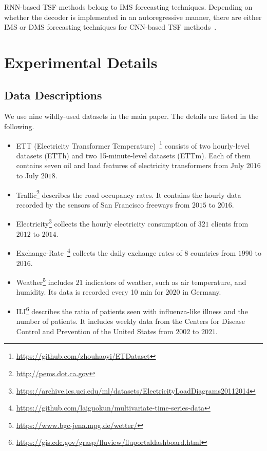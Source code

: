 RNN-based TSF methods belong to IMS forecasting techniques. Depending on whether the decoder is implemented in an autoregressive manner, there are either IMS or DMS forecasting techniques for CNN-based TSF methods~\cite{bai2018empirical,liu2021time}. 

\section{Experimental Details}
\label{sec:supp_exp}
\subsection{Data Descriptions}
We use nine wildly-used datasets in the main paper. The details are listed in the following.
%
\begin{itemize}
\item ETT (Electricity Transformer Temperature)~\cite{informer}\footnote{\url{https://github.com/zhouhaoyi/ETDataset}} consists of two hourly-level datasets (ETTh) and two 15-minute-level datasets (ETTm). Each of them contains seven oil and load features of electricity transformers from July $2016$ to July $2018$.
%
\item Traffic\footnote{\url{http://pems.dot.ca.gov}} describes the road occupancy rates. It contains the hourly data recorded by the sensors of San Francisco freeways from $2015$ to $2016$. 
%
\item Electricity\footnote{\url{https://archive.ics.uci.edu/ml/datasets/ElectricityLoadDiagrams20112014}} collects the hourly electricity consumption of $321$ clients from $2012$ to $2014$.
%
\item Exchange-Rate~\cite{GuokunLai2017lstm}\footnote{\url{https://github.com/laiguokun/multivariate-time-series-data}} collects the daily exchange rates of $8$ countries from $1990$ to $2016$.
%
\item Weather\footnote{\url{https://www.bgc-jena.mpg.de/wetter/}} includes $21$ indicators of weather, such as air temperature, and humidity. Its data is recorded every 10 min for $2020$ in Germany.
%
\item ILI\footnote{\url{https://gis.cdc.gov/grasp/fluview/fluportaldashboard.html}} describes the ratio of patients seen with influenza-like illness and the number of patients. It includes weekly data from the Centers for Disease Control and Prevention of the United States from $2002$ to $2021$.

\end{itemize}


